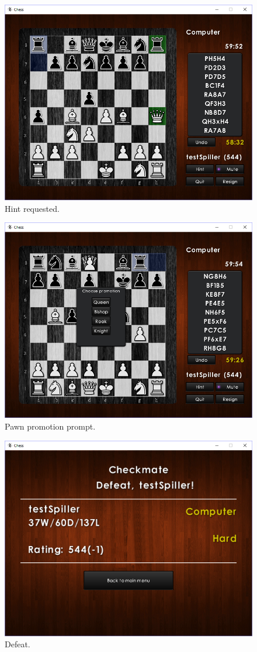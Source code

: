 \documentclass[12pt, a4paper]{article}
\begin{document}
\begin{figure}[ht!]
	\centering
	\includegraphics[width=0.8\linewidth]{figures/hint.png}
	\caption{Hint requested.}
\end{figure}
\begin{figure}[ht!]
	\centering
	\includegraphics[width=0.8\linewidth]{figures/promotion.png}
	\caption{Pawn promotion prompt.}
\end{figure}
\begin{figure}[ht!]
	\centering
	\includegraphics[width=0.8\linewidth]{figures/defeat.png}
	\caption{Defeat.}
\end{figure}
\end{document}
